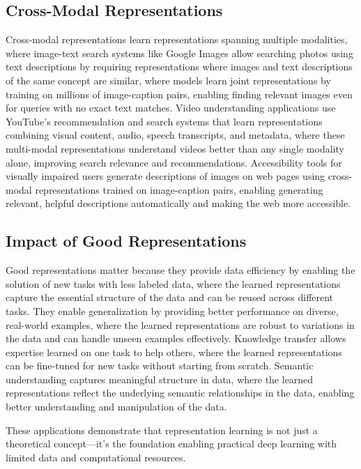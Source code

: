 \subsection{Cross-Modal Representations}

Cross-modal representations learn representations spanning multiple modalities, where image-text search systems like Google Images allow searching photos using text descriptions by requiring representations where images and text descriptions of the same concept are similar, where models learn joint representations by training on millions of image-caption pairs, enabling finding relevant images even for queries with no exact text matches. Video understanding applications use YouTube's recommendation and search systems that learn representations combining visual content, audio, speech transcripts, and metadata, where these multi-modal representations understand videos better than any single modality alone, improving search relevance and recommendations. Accessibility tools for visually impaired users generate descriptions of images on web pages using cross-modal representations trained on image-caption pairs, enabling generating relevant, helpful descriptions automatically and making the web more accessible.

\subsection{Impact of Good Representations}

Good representations matter because they provide data efficiency by enabling the solution of new tasks with less labeled data, where the learned representations capture the essential structure of the data and can be reused across different tasks. They enable generalization by providing better performance on diverse, real-world examples, where the learned representations are robust to variations in the data and can handle unseen examples effectively. Knowledge transfer allows expertise learned on one task to help others, where the learned representations can be fine-tuned for new tasks without starting from scratch. Semantic understanding captures meaningful structure in data, where the learned representations reflect the underlying semantic relationships in the data, enabling better understanding and manipulation of the data.

These applications demonstrate that representation learning is not just a theoretical concept—it's the foundation enabling practical deep learning with limited data and computational resources.

